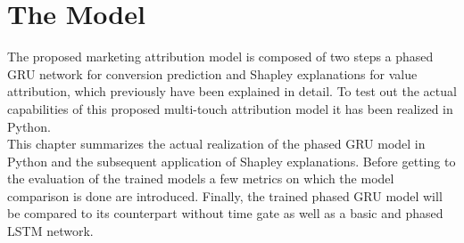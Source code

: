 \chapter{The Model}
The proposed marketing attribution model is composed of two steps a phased GRU network for conversion prediction and  Shapley explanations for value attribution, which previously have been explained in detail.  
To test out the actual capabilities of this proposed multi-touch attribution model it has been realized in Python.\\
This chapter summarizes the actual realization of the phased GRU model in Python and the subsequent application of Shapley explanations. Before getting to the evaluation of the trained models a few metrics on which the model comparison is done are introduced. Finally, the trained phased GRU model will be compared to its counterpart without time gate as well as a basic and phased LSTM network.

